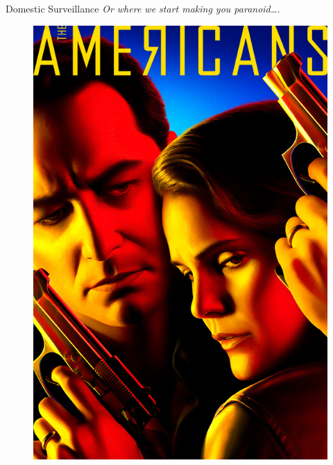 \documentclass[nobackground,dvipsnames,table]{beamer}
\begin{document}
\begin{frame}{Domestic Surveillance}
    \centering
    \textit{Or where we start making you paranoid….}
    \begin{figure}
        \centering
        \includegraphics[height=0.6\textheight]{americans-poster}
    \end{figure}
\end{frame}
\end{document}
